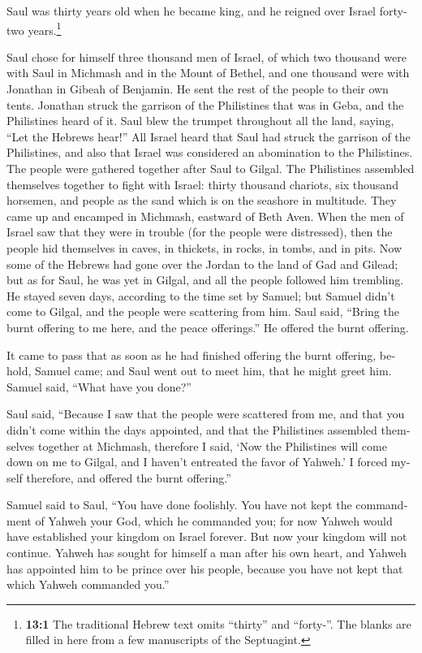 \begin{paracol}{2}
\begin{otherlanguage}{english}
 Saul was thirty years old when he became king, and he
reigned over Israel forty-two years.\footnote{\textbf{13:1} The
  traditional Hebrew text omits ``thirty'' and ``forty-''. The blanks
  are filled in here from a few manuscripts of the Septuagint.}

 Saul chose for himself three thousand men of Israel, of
which two thousand were with Saul in Michmash and in the Mount of
Bethel, and one thousand were with Jonathan in Gibeah of Benjamin. He
sent the rest of the people to their own tents.  Jonathan
struck the garrison of the Philistines that was in Geba, and the
Philistines heard of it. Saul blew the trumpet throughout all the land,
saying, ``Let the Hebrews hear!''  All Israel heard that
Saul had struck the garrison of the Philistines, and also that Israel
was considered an abomination to the Philistines. The people were
gathered together after Saul to Gilgal.  The Philistines
assembled themselves together to fight with Israel: thirty thousand
chariots, six thousand horsemen, and people as the sand which is on the
seashore in multitude. They came up and encamped in Michmash, eastward
of Beth Aven.  When the men of Israel saw that they were
in trouble (for the people were distressed), then the people hid
themselves in caves, in thickets, in rocks, in tombs, and in pits.
 Now some of the Hebrews had gone over the Jordan to the
land of Gad and Gilead; but as for Saul, he was yet in Gilgal, and all
the people followed him trembling.  He stayed seven days,
according to the time set by Samuel; but Samuel didn't come to Gilgal,
and the people were scattering from him.  Saul said,
``Bring the burnt offering to me here, and the peace offerings.'' He
offered the burnt offering.

 It came to pass that as soon as he had finished offering
the burnt offering, behold, Samuel came; and Saul went out to meet him,
that he might greet him.  Samuel said, ``What have you
done?''

Saul said, ``Because I saw that the people were scattered from me, and
that you didn't come within the days appointed, and that the Philistines
assembled themselves together at Michmash,  therefore I
said, `Now the Philistines will come down on me to Gilgal, and I haven't
entreated the favor of Yahweh.' I forced myself therefore, and offered
the burnt offering.''

 Samuel said to Saul, ``You have done foolishly. You have
not kept the commandment of Yahweh your God, which he commanded you; for
now Yahweh would have established your kingdom on Israel forever.
 But now your kingdom will not continue. Yahweh has
sought for himself a man after his own heart, and Yahweh has appointed
him to be prince over his people, because you have not kept that which
Yahweh commanded you.''


\end{otherlanguage}
\end{paracol}

